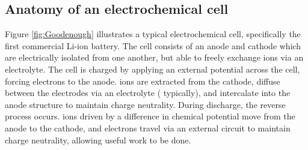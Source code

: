 \subsection{Anatomy of an electrochemical cell}
Figure \ref{fig:Goodenough} illustrates a typical electrochemical cell, specifically the first commercial Li-ion battery.
The cell consists of an anode and cathode which are electrically isolated from one another, but able to freely exchange ions via an electrolyte.
The cell is charged by applying an external potential across the cell, forcing electrons to the anode.
 ions are extracted from the  cathode, diffuse between the electrodes via an electrolyte ( typically), and intercalate into the anode structure to maintain charge neutrality.
During discharge, the reverse process occurs.
 ions driven by a difference in chemical potential move from the anode to the cathode, and electrons travel via an external circuit to maintain charge neutrality, allowing useful work to be done.


